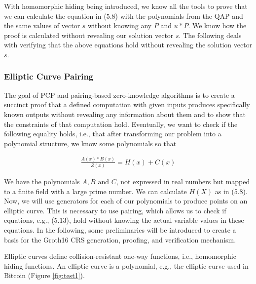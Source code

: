 With homomorphic hiding being introduced, we know all the tools to prove that we can calculate the equation in (5.8) with the polynomials from the QAP and the same values of vector \(s\) without knowing any \(P\) and \(u * P\). We know how the proof is calculated without revealing our solution vector \(s\). The following deals with verifying that the above equations hold without revealing the solution vector \(s\).

\subsubsection{Elliptic Curve Pairing}
The goal of PCP and pairing-based zero-knowledge algorithms is to create a succinct proof that a defined computation with given inputs produces specifically known outputs without revealing any information about them and to show that the constraints of that computation hold. Eventually, we want to check if the following equality holds, i.e., that after transforming our problem into a polynomial structure, we know some polynomials so that

\begin{align}
    \frac{A(x) * B(x)}{Z(x)} = H(x) + C(x)
\end{align}

We have the polynomials \(A, B \text{ and }C\), not expressed in real numbers but mapped to a finite field with a large prime number. We can calculate \(H(X)\) as in (5.8). Now, we will use generators for each of our polynomials to produce points on an elliptic curve. This is necessary to use pairing, which allows us to check if equations, e.g., (5.13), hold without knowing the actual variable values in these equations. In the following, some preliminaries will be introduced to create a basis for the Groth16 CRS generation, proofing, and verification mechanism.

Elliptic curves define collision-resistant one-way functions, i.e., homomorphic hiding functions. An elliptic curve is a polynomial, e.g., the elliptic curve used in Bitcoin (Figure \ref{fig:test1}). 

